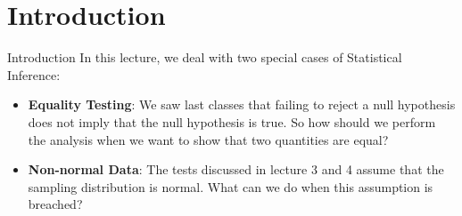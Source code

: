 \section{Introduction}

\begin{frame}{Introduction}
  In this lecture, we deal with two special cases of Statistical Inference:\bigskip
  \begin{itemize}
    \item {\bf Equality Testing}: We saw last classes that failing to reject a null hypothesis does not imply that the null hypothesis is true. So how should we perform the analysis when we want to show that two quantities are equal?\medskip

    \item {\bf Non-normal Data}: The tests discussed in lecture 3 and 4 assume that the sampling distribution is normal. What can we do when this assumption is breached?
  \end{itemize}\bigskip
\end{frame}
